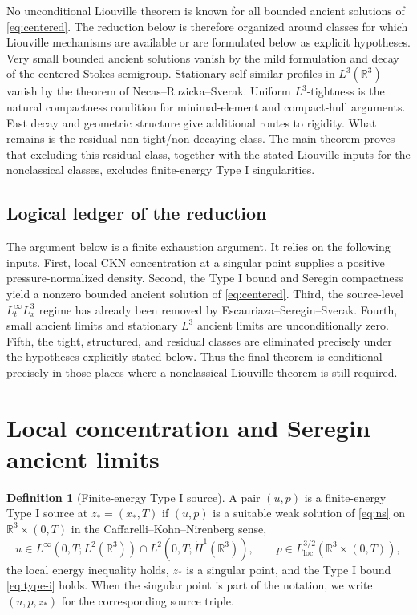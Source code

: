 \documentclass[11pt]{amsart}
\theoremstyle{plain}
\theoremstyle{definition}
\newtheorem{definition}[theorem]{Definition}
\theoremstyle{remark}
\numberwithin{equation}{section}
\begin{document}
No unconditional Liouville theorem is known for all bounded ancient solutions
of \eqref{eq:centered}.  The reduction below is therefore organized around
classes for which Liouville mechanisms are available or are formulated below
as explicit hypotheses.  Very small bounded ancient solutions vanish by the mild
formulation and decay of the centered Stokes semigroup.  Stationary
self-similar profiles in \(L^3(\mathbb R^3)\) vanish by the theorem of
Necas--Ruzicka--Sverak.  Uniform \(L^3\)-tightness is the natural compactness
condition for minimal-element and compact-hull arguments.  Fast decay and
geometric structure give additional routes to rigidity.  What remains is the
residual non-tight/non-decaying class.  The main theorem proves that excluding
this residual class, together with the stated Liouville inputs for the
nonclassical classes, excludes finite-energy Type I singularities.

\subsection{Logical ledger of the reduction}

The argument below is a finite exhaustion argument.  It relies on the following
inputs.  First, local CKN concentration at a singular point
supplies a positive pressure-normalized density.  Second, the Type I bound and
Seregin compactness yield a nonzero bounded
ancient solution of \eqref{eq:centered}.  Third, the source-level
\(L^\infty_tL^3_x\) regime has already been removed by
Escauriaza--Seregin--Sverak.  Fourth, small ancient limits and stationary
\(L^3\) ancient limits are unconditionally zero.  Fifth, the tight,
structured, and residual classes are eliminated precisely under the hypotheses
explicitly stated below.  Thus the final theorem is conditional precisely in
those places where a nonclassical Liouville theorem is still required.

\section{Local concentration and Seregin ancient limits}

\begin{definition}[Finite-energy Type I source]\label{def:source}
A pair \((u,p)\) is a finite-energy Type I source at \(z_*=(x_*,T)\) if
\((u,p)\) is a suitable weak solution of \eqref{eq:ns} on
\(\mathbb R^3\times(0,T)\) in the Caffarelli--Kohn--Nirenberg sense,
\[
   u\in L^\infty(0,T;L^2(\mathbb R^3))
      \cap L^2(0,T;\dot H^1(\mathbb R^3)),
   \qquad
   p\in L^{3/2}_{\mathrm{loc}}(\mathbb R^3\times(0,T)),
\]
the local energy inequality holds, \(z_*\) is a singular point, and the Type I
bound \eqref{eq:type-i} holds.
When the singular point is part of the notation, we write
\((u,p,z_*)\) for the corresponding source triple.
\end{definition}
\end{document}
